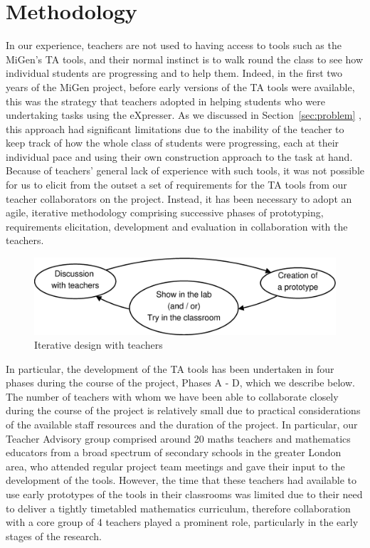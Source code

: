 \section{Methodology}
\label{sec:methodology}

In our experience, teachers are not used to having access to tools
such as the MiGen’s TA tools, and their normal instinct is to walk
round the class to see how individual students are progressing and to
help them.  Indeed, in the first two years of the MiGen project,
before early versions of the TA tools were available, this was the
strategy that teachers adopted in helping students who were
undertaking tasks using the eXpresser.  As we discussed in
Section~\ref{sec:problem} ,
this approach had significant limitations due to the inability of the
teacher to keep track of how the whole class of students were
progressing, each at their individual pace and using their own
construction approach to the task at hand. Because of teachers’
general lack of experience with such tools, it was not possible for us
to elicit from the outset a set of requirements for the TA tools from
our teacher collaborators on the project. Instead, it has been
necessary to adopt an agile, iterative methodology comprising
successive phases of prototyping, requirements elicitation,
development and evaluation in collaboration with the teachers. 

\begin{figure}[htbp]
  \centering
  \includegraphics[width=\textwidth]{gfx/methodology.eps}
  \caption{Iterative design with teachers}
  \label{fig:it-teachers}
\end{figure}

In particular, the development of the TA tools has been undertaken in
four phases during the course of the project, Phases A - D, which we
describe below. The number of teachers with whom we have been able to
collaborate closely during the course of the project is relatively
small due to practical considerations of the available staff resources
and the duration of the project. In particular, our Teacher Advisory
group comprised around 20 maths teachers and mathematics educators
from a broad spectrum of secondary schools in the greater London area,
who attended regular project team meetings and gave their input to the
development of the tools. However, the time that these teachers had
available to use early prototypes of the tools in their classrooms was
limited due to their need to deliver a tightly timetabled mathematics
curriculum, therefore collaboration with a core group of 4 teachers
played a prominent role, particularly in the early stages of the
research.
 
